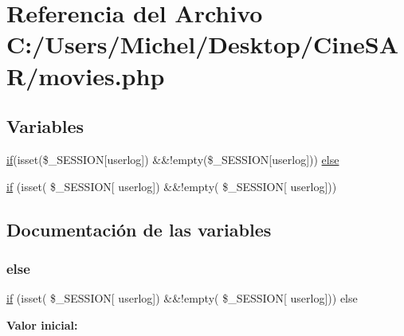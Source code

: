 \hypertarget{movies_8php}{}\section{Referencia del Archivo C\+:/\+Users/\+Michel/\+Desktop/\+Cine\+S\+A\+R/movies.php}
\label{movies_8php}
\subsection*{Variables}
\begin{DoxyCompactItemize}
\item 
\mbox{\hyperlink{register_8php_aefb5893336d7ead40ae915367f4b82cc}{if}}(isset(\$\+\_\+\+S\+E\+S\+S\+I\+ON\mbox{[}\textquotesingle{}userlog\textquotesingle{}\mbox{]}) \&\&!empty(\$\+\_\+\+S\+E\+S\+S\+I\+ON\mbox{[}\textquotesingle{}userlog\textquotesingle{}\mbox{]})) \mbox{\hyperlink{movies_8php_a3e85a20b0f9c4bed1d7e6bf901f6030c}{else}}
\item 
\mbox{\hyperlink{movies_8php_aefb5893336d7ead40ae915367f4b82cc}{if}} (isset( \$\+\_\+\+S\+E\+S\+S\+I\+ON\mbox{[} \textquotesingle{}userlog\textquotesingle{}\mbox{]}) \&\&!empty( \$\+\_\+\+S\+E\+S\+S\+I\+ON\mbox{[} \textquotesingle{}userlog\textquotesingle{}\mbox{]}))
\end{DoxyCompactItemize}


\subsection{Documentación de las variables}
\mbox{\label{movies_8php_a3e85a20b0f9c4bed1d7e6bf901f6030c}} 
\subsubsection{\texorpdfstring{else}{else}}
{\footnotesize\ttfamily \mbox{\hyperlink{register_8php_aefb5893336d7ead40ae915367f4b82cc}{if}} (isset( \$\+\_\+\+S\+E\+S\+S\+I\+ON\mbox{[} \textquotesingle{}userlog\textquotesingle{}\mbox{]}) \&\&!empty( \$\+\_\+\+S\+E\+S\+S\+I\+ON\mbox{[} \textquotesingle{}userlog\textquotesingle{}\mbox{]})) else}

{\bfseries Valor inicial\+:}
\begin{DoxyCode}{0}
\DoxyCodeLine{\{}

\end{DoxyCode}


